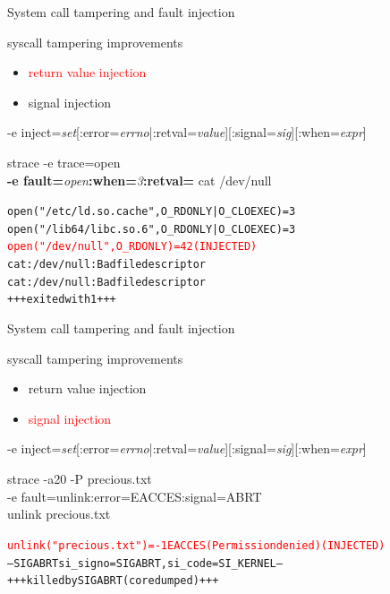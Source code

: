 \documentclass[unicode,aspectratio=169]{beamer}
\begin{document}
\begin{frame}[fragile]{System call tampering and fault injection}
\begin{block}{\large syscall tampering improvements}
\begin{itemize}
	\item \textcolor{red}{return value injection}
	\item signal injection
\end{itemize}
\end{block}
-e inject=\textit{set}[:error=\textit{errno}|:retval=\textit{value}][:signal=\textit{sig}][:when=\textit{expr}]
\begin{block}{\large strace -e trace=open \\ {\bf -e fault=}{\it open}{\bf :when=}{\it 3}{\bf :retval=}{}
cat /dev/null}
\begin{alltt}
open("/etc/ld.so.cache", O_RDONLY|O_CLOEXEC) = 3
open("/lib64/libc.so.6", O_RDONLY|O_CLOEXEC) = 3
\textcolor{red}{open("/dev/null", O_RDONLY)             = 42 (INJECTED)}
cat: /dev/null: Bad file descriptor
cat: /dev/null: Bad file descriptor
+++ exited with 1 +++
\end{alltt}
\end{block}
\end{frame}

\begin{frame}[fragile]{System call tampering and fault injection}
\begin{block}{\large syscall tampering improvements}
\begin{itemize}
	\item return value injection
	\item \textcolor{red}{signal injection}
\end{itemize}
\end{block}
-e inject=\textit{set}[:error=\textit{errno}|:retval=\textit{value}][:signal=\textit{sig}][:when=\textit{expr}]
\begin{block}{\large strace -a20 -P precious.txt \\ -e fault=unlink:error=EACCES:signal=ABRT \\ unlink precious.txt}
\begin{alltt}
\textcolor{red}{unlink("precious.txt") = -1 EACCES (Permission denied) (INJECTED)}
--- SIGABRT {si_signo=SIGABRT, si_code=SI_KERNEL} ---
+++ killed by SIGABRT (core dumped) +++
\end{alltt}
\end{block}
\end{frame}
\end{document}
